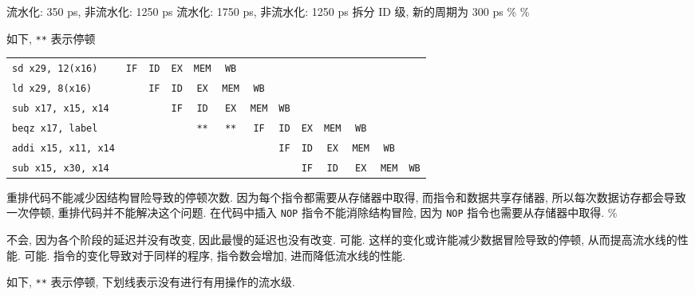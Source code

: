 \documentclass[11pt]{homework}
\begin{document}
\maketitle
\question
\begin{arabicparts}
    \questionpart 流水化: 350 ps, 非流水化: 1250 ps
    \questionpart 流水化: 1750 ps, 非流水化: 1250 ps
    \questionpart 拆分 ID 级, 新的周期为 300 ps
    \%
    \%
\end{arabicparts}
\question
\begin{arabicparts}
    \questionpart 如下, \texttt{**} 表示停顿
    \begin{center}
        \begin{tabular}{lcccccccccccc}
            \texttt{sd   x29, 12(x16)}  & \texttt{IF} & \texttt{ID} & \texttt{EX} & \texttt{MEM} & \texttt{WB}  &              &             &             &              &              &              &             \\
            \texttt{ld   x29, 8(x16)}   &             & \texttt{IF} & \texttt{ID} & \texttt{EX}  & \texttt{MEM} & \texttt{WB}  &             &             &              &              &              &             \\
            \texttt{sub  x17, x15, x14} &             &             & \texttt{IF} & \texttt{ID}  & \texttt{EX}  & \texttt{MEM} & \texttt{WB} &             &              &              &              &             \\
            \texttt{beqz x17, label}    &             &             &             & \texttt{**}  & \texttt{**}  & \texttt{IF}  & \texttt{ID} & \texttt{EX} & \texttt{MEM} & \texttt{WB}  &              &             \\
            \texttt{addi x15, x11, x14} &             &             &             &              &              &              & \texttt{IF} & \texttt{ID} & \texttt{EX}  & \texttt{MEM} & \texttt{WB}  &             \\
            \texttt{sub  x15, x30, x14} &             &             &             &              &              &              &             & \texttt{IF} & \texttt{ID}  & \texttt{EX}  & \texttt{MEM} & \texttt{WB}
        \end{tabular}
    \end{center}
    \questionpart 重排代码不能减少因结构冒险导致的停顿次数. 因为每个指令都需要从存储器中取得, 而指令和数据共享存储器, 所以每次数据访存都会导致一次停顿, 重排代码并不能解决这个问题.
    \questionpart 在代码中插入 \texttt{NOP} 指令不能消除结构冒险, 因为 \texttt{NOP} 指令也需要从存储器中取得.
    \%
\end{arabicparts}
\question
\begin{arabicparts}
    \questionpart 不会, 因为各个阶段的延迟并没有改变, 因此最慢的延迟也没有改变.
    \questionpart 可能. 这样的变化或许能减少数据冒险导致的停顿, 从而提高流水线的性能.
    \questionpart 可能. 指令的变化导致对于同样的程序, 指令数会增加, 进而降低流水线的性能.
\end{arabicparts}
\newpage
\question
如下, \texttt{**} 表示停顿, 下划线表示没有进行有用操作的流水级.
\end{document}
